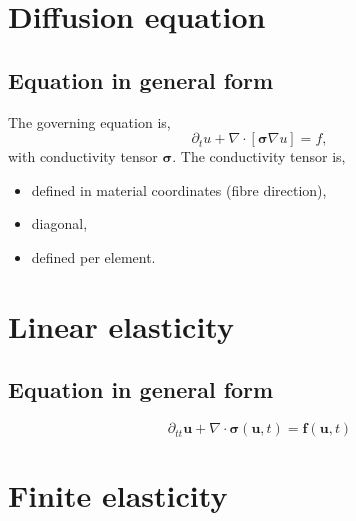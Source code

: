 \documentclass[
10pt, %
a4paper, %
oneside, %
headinclude,footinclude, %
BCOR5mm, %
]{scrartcl}
\begin{document}
\section{Diffusion equation}
%
\subsection{Equation in general form}
%
The governing equation is,
%
\begin{equation}
    \partial_t u + \nabla \cdot [\boldsymbol{\sigma} \nabla u] = f,
\end{equation}
%
with conductivity tensor $\boldsymbol{\sigma}$. The conductivity tensor is,
%
\begin{itemize}
    \item{defined in material coordinates (fibre direction),}
    \item{diagonal,}
    \item{defined per element.}
\end{itemize}
%
%
%
%
%
%
%
%
%

%
%
%
%
%
%
\clearpage
%
\section{Linear elasticity}
%
\subsection{Equation in general form}
%
\begin{equation}
    \partial_{tt} \boldsymbol{u} + \nabla \cdot \boldsymbol{\sigma} (\boldsymbol{u}, t) = \boldsymbol{f} (\boldsymbol{u}, t)
\end{equation}
%
%
%

%

%

%
\clearpage
%
\section{Finite elasticity}
%
%
%
%
\clearpage
%
\end{document}
